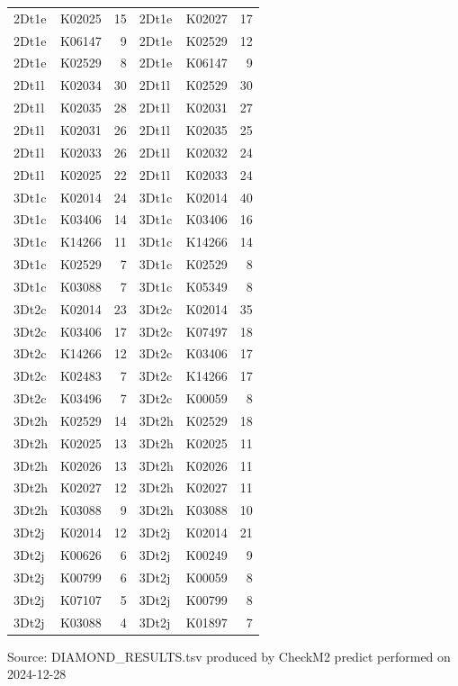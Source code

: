 \documentclass[
  letterpaper,
  DIV=11,
  numbers=noendperiod]{scrreprt}
\begin{document}
\begin{table}
{\begin{tabular*}{\linewidth}{@{\extracolsep{\fill}}llrllr}
2Dt1e & K02025 & 15 & 2Dt1e & K02027 & 17 \\ 
2Dt1e & K06147 & 9 & 2Dt1e & K02529 & 12 \\ 
2Dt1e & K02529 & 8 & 2Dt1e & K06147 & 9 \\ 
2Dt1l & K02034 & 30 & 2Dt1l & K02529 & 30 \\ 
2Dt1l & K02035 & 28 & 2Dt1l & K02031 & 27 \\ 
2Dt1l & K02031 & 26 & 2Dt1l & K02035 & 25 \\ 
2Dt1l & K02033 & 26 & 2Dt1l & K02032 & 24 \\ 
2Dt1l & K02025 & 22 & 2Dt1l & K02033 & 24 \\ 
3Dt1c & K02014 & 24 & 3Dt1c & K02014 & 40 \\ 
3Dt1c & K03406 & 14 & 3Dt1c & K03406 & 16 \\ 
3Dt1c & K14266 & 11 & 3Dt1c & K14266 & 14 \\ 
3Dt1c & K02529 & 7 & 3Dt1c & K02529 & 8 \\ 
3Dt1c & K03088 & 7 & 3Dt1c & K05349 & 8 \\ 
3Dt2c & K02014 & 23 & 3Dt2c & K02014 & 35 \\ 
3Dt2c & K03406 & 17 & 3Dt2c & K07497 & 18 \\ 
3Dt2c & K14266 & 12 & 3Dt2c & K03406 & 17 \\ 
3Dt2c & K02483 & 7 & 3Dt2c & K14266 & 17 \\ 
3Dt2c & K03496 & 7 & 3Dt2c & K00059 & 8 \\ 
3Dt2h & K02529 & 14 & 3Dt2h & K02529 & 18 \\ 
3Dt2h & K02025 & 13 & 3Dt2h & K02025 & 11 \\ 
3Dt2h & K02026 & 13 & 3Dt2h & K02026 & 11 \\ 
3Dt2h & K02027 & 12 & 3Dt2h & K02027 & 11 \\ 
3Dt2h & K03088 & 9 & 3Dt2h & K03088 & 10 \\ 
3Dt2j & K02014 & 12 & 3Dt2j & K02014 & 21 \\ 
3Dt2j & K00626 & 6 & 3Dt2j & K00249 & 9 \\ 
3Dt2j & K00799 & 6 & 3Dt2j & K00059 & 8 \\ 
3Dt2j & K07107 & 5 & 3Dt2j & K00799 & 8 \\ 
3Dt2j & K03088 & 4 & 3Dt2j & K01897 & 7 \\ 
\bottomrule
\end{tabular*}
\begin{minipage}{\linewidth}
Source: DIAMOND\_RESULTS.tsv produced by CheckM2 predict performed on 2024-12-28\\
\end{minipage}

}

\end{table}%
\end{document}
